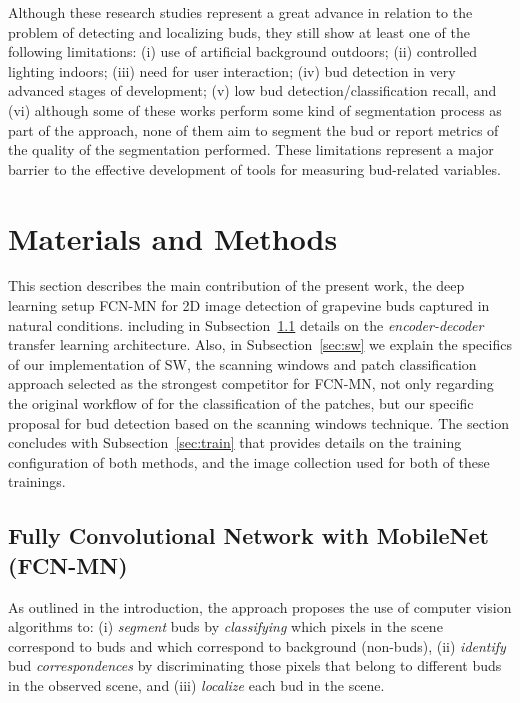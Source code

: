 \documentclass[a4paper,authoryear,review]{elsarticle}
\begin{document}
Although these research studies represent a great advance in relation to the problem of detecting and localizing buds, they still show at least one of the following limitations: (i) use of artificial background outdoors; (ii) controlled lighting indoors; (iii) need for user interaction; (iv) bud detection in very advanced stages of development; (v) low bud detection/classification recall, and (vi) although some of these works perform some kind of segmentation process as part of the approach, none of them aim to segment the bud or report metrics of the quality of the segmentation performed. These limitations represent a major barrier to the effective development of tools for measuring bud-related variables. 

\section{Materials and Methods}
\label{sec:matmet}

This section describes the main contribution of the present work, the deep learning setup FCN-MN for 2D image detection of grapevine buds captured in natural conditions. including in Subsection~\ref{sec:fcn} details on the \emph{encoder-decoder} transfer learning architecture. 
%
Also, in Subsection~\ref{sec:sw} we explain the specifics of our implementation of SW, the scanning windows and patch classification approach selected as the strongest competitor for FCN-MN, not only regarding the original workflow of \citet{perez2017image} for the classification of the patches, but our specific proposal for bud detection based on the scanning windows technique.
%
The section concludes with Subsection~\ref{sec:train} that provides details on the training configuration of both methods, and the image collection used for both of these trainings.

\subsection{Fully Convolutional Network with MobileNet (FCN-MN)}
\label{sec:fcn}

As outlined in the introduction, the approach proposes the use of computer vision algorithms to: (i) \emph{segment} buds by \emph{classifying} which pixels in the scene correspond to buds and which correspond to background (non-buds), (ii) \emph{identify} bud \emph{correspondences} by discriminating those pixels that belong to different buds in the observed scene, and (iii) \emph{localize} each bud in the scene. 
\end{document}
